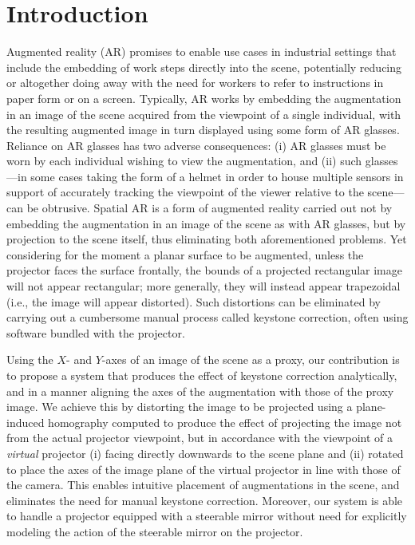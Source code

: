\documentclass[review]{elsarticle}
\begin{document}
\linenumbers

\section{Introduction}\label{sec:intro}

Augmented reality (AR) promises to enable use cases in industrial settings that include the embedding of work steps directly into the scene, potentially reducing or altogether doing away with the need for workers to refer to instructions in paper form or on a screen. Typically, AR works by embedding the augmentation in an image of the scene acquired from the viewpoint of a single individual, with the resulting augmented image in turn displayed using some form of AR glasses. Reliance on AR glasses has two adverse consequences: (i) AR glasses must be worn by each individual wishing to view the augmentation, and (ii) such glasses---in some cases taking the form of a helmet in order to house multiple sensors in support of accurately tracking the viewpoint of the viewer relative to the scene---can be obtrusive. Spatial AR is a form of augmented reality carried out not by embedding the augmentation in an image of the scene as with AR glasses, but by projection to the scene itself, thus eliminating both aforementioned problems. Yet considering for the moment a planar surface to be augmented, unless the projector faces the surface frontally, the bounds of a projected rectangular image will not appear rectangular; more generally, they will instead appear trapezoidal (i.e., the image will appear distorted). Such distortions can be eliminated by carrying out a cumbersome manual process called keystone correction, often using software bundled with the projector.

Using the $X$- and $Y$-axes of an image of the scene as a proxy, our contribution is to propose a system that produces the effect of keystone correction analytically, and in a manner aligning the axes of the augmentation with those of the proxy image. We achieve this by distorting the image to be projected using a plane-induced homography computed to produce the effect of projecting the image not from the actual projector viewpoint, but in accordance with the viewpoint of a \textit{virtual} projector (i) facing directly downwards to the scene plane and (ii) rotated to place the axes of the image plane of the virtual projector in line with those of the camera. This enables intuitive placement of augmentations in the scene, and eliminates the need for manual keystone correction. Moreover, our system is able to handle a projector equipped with a steerable mirror without need for explicitly modeling the action of the steerable mirror on the projector.
\end{document}
